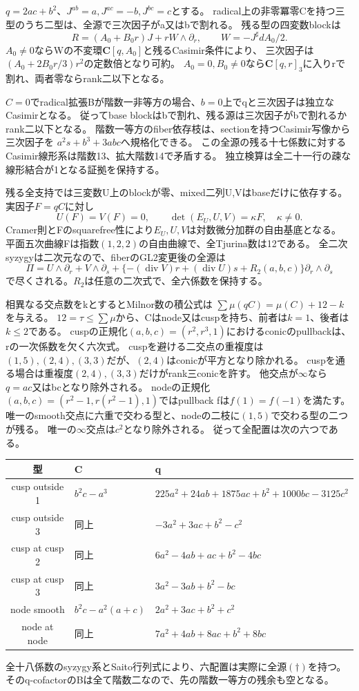 \documentclass[a4paper,11pt]{ltjsarticle}
\theoremstyle{definition}
\newcommand{\CC}{\mathbf C}
\begin{document}
$q=2ac+b^2$、$J^{ab}=a,J^{ac}=-b,J^{bc}=c$とする。
radical上の非零冪零Cを持つ三型のうち二型は、全源で三次因子がa又はbで割れる。
残る型の四変数blockは
\[
 R=(A_0+B_0r)J+rW\wedge\partial_r,\qquad W=-J^\sharp dA_0/2.
\]
$A_0\ne0$ならWの不変環$\CC[q,A_0]$と残るCasimir条件により、
三次因子は$(A_0+2B_0r/3)r^2$の定数倍となり可約。
$A_0=0,B_0\ne0$なら$\CC[q,r]_3$に入りrで割れ、両者零ならrank二以下となる。

$C=0$でradical拡張Bが階数一非等方の場合、$b=0$上でqと三次因子は独立なCasimirとなる。
従ってbase blockはbで割れ、残る源は三次因子がbで割れるかrank二以下となる。
階数一等方のfiber依存枝は、sectionを持つCasimir写像から三次因子を
$a^2s+b^3+3abc$へ規格化できる。
この全源の残る十七係数に対するCasimir線形系は階数13、拡大階数14で矛盾する。
独立検算は全二十一行の疎な線形結合が1となる証拠を保持する。

残る全支持では三変数U上のblockが零、mixed二列U,Vはbaseだけに依存する。
実因子$F=qC$に対し
\[
 U(F)=V(F)=0,\qquad \det(E_U,U,V)=\kappa F,\quad\kappa\ne0.
\]
Cramer則とFのsquarefree性により$E_U,U,V$は対数微分加群の自由基底となる。
平面五次曲線Fは指数$(1,2,2)$の自由曲線で、全Tjurina数は12である。
全二次syzygyは二次元なので、fiberのGL2変更後の全源は
\[
 \Pi=U\wedge\partial_r+V\wedge\partial_s+
 \{-(\operatorname{div}V)r+(\operatorname{div}U)s+R_2(a,b,c)\}\partial_r\wedge\partial_s
 \tag{\dagger}
\]
で尽くされる。$R_2$は任意の二次式で、全六係数を保持する。

相異なる交点数をkとするとMilnor数の積公式は
$\sum\mu(qC)=\mu(C)+12-k$を与える。
$12=\tau\le\sum\mu$から、Cはnode又はcuspを持ち、前者は$k=1$、後者は$k\le2$である。
cuspの正規化$(a,b,c)=(r^2,r^3,1)$におけるconicのpullbackは、rの一次係数を欠く六次式。
cuspを避ける二交点の重複度は$(1,5),(2,4),(3,3)$だが、$(2,4)$はconicが平方となり除かれる。
cuspを通る場合は重複度$(2,4),(3,3)$だけがrank三conicを許す。
他交点が$\infty$なら$q=ac$又はbcとなり除外される。
nodeの正規化$(a,b,c)=(r^2-1,r(r^2-1),1)$ではpullback fは$f(1)=f(-1)$を満たす。
唯一のsmooth交点に六重で交わる型と、nodeの二枝に$(1,5)$で交わる型の二つが残る。
唯一の$\infty$交点は$c^2$となり除外される。
従って全配置は次の六つである。
\begin{center}\small
\begin{tabular}{c|l|l}
型&C&q\\\hline
cusp outside 1&$b^2c-a^3$&$225a^2+24ab+1875ac+b^2+1000bc-3125c^2$\\
cusp outside 3&同上&$-3a^2+3ac+b^2-c^2$\\
cusp at cusp 2&同上&$6a^2-4ab+ac+b^2-4bc$\\
cusp at cusp 3&同上&$3a^2-3ab+b^2-bc$\\
node smooth&$b^2c-a^2(a+c)$&$2a^2+3ac+b^2+c^2$\\
node at node&同上&$7a^2+4ab+8ac+b^2+8bc$
\end{tabular}
\end{center}
全十八係数のsyzygy系とSaito行列式により、六配置は実際に全源$(\dagger)$を持つ。
そのq-cofactorのBは全て階数二なので、先の階数一等方の残余も空となる。
\end{document}
